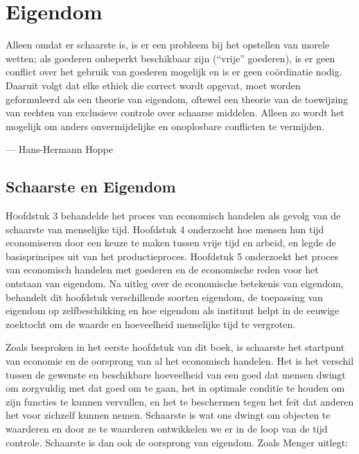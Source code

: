 \chapter{Eigendom}

\begin{blockquotebox}
    Alleen omdat er schaarste is, is er een probleem bij het opstellen van morele wetten; als goederen onbeperkt beschikbaar zijn (\enquote{vrije} goederen), is er geen conflict over het gebruik van goederen mogelijk en is er geen coördinatie nodig. Daaruit volgt dat elke ethiek die correct wordt opgevat, moet worden geformuleerd als een theorie van eigendom, oftewel een theorie van de toewijzing van rechten van exclusieve controle over schaarse middelen. Alleen zo wordt het mogelijk om anders onvermijdelijke en onoplosbare conflicten te vermijden.\footnotemark
    \par\raggedleft--- Hans-Hermann Hoppe
\end{blockquotebox}


\section{Schaarste en Eigendom}

\lettrine{H}oofdstuk 3 behandelde het proces van economisch handelen als gevolg van de schaarste van menselijke tijd. Hoofdstuk 4 onderzocht hoe mensen hun tijd economiseren door een keuze te maken tussen vrije tijd en arbeid, en legde de basisprincipes uit van het productieproces. Hoofdstuk 5 onderzoekt het proces van economisch handelen met goederen en de economische reden voor het ontstaan van eigendom. Na uitleg over de economische betekenis van eigendom, behandelt dit hoofdstuk verschillende soorten eigendom, de toepassing van eigendom op zelfbeschikking en hoe eigendom als instituut helpt in de eeuwige zoektocht om de waarde en hoeveelheid menselijke tijd te vergroten.

Zoals besproken in het eerste hoofdstuk van dit boek, is schaarste het startpunt van economie en de oorsprong van al het economisch handelen. Het is het verschil tussen de gewenste en beschikbare hoeveelheid van een goed dat mensen dwingt om zorgvuldig met dat goed om te gaan, het in optimale conditie te houden om zijn functies te kunnen vervullen, en het te beschermen tegen het feit dat anderen het voor zichzelf kunnen nemen. Schaarste is wat ons dwingt om objecten te waarderen en door ze te waarderen ontwikkelen we er in de loop van de tijd controle. Schaarste is dan ook de oorsprong van eigendom. Zoals Menger uitlegt:

